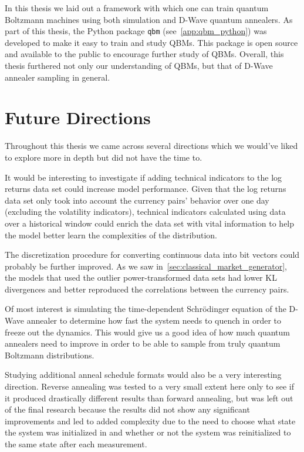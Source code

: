 In this thesis we laid out a framework with which one can train quantum Boltzmann machines using both simulation and D-Wave quantum annealers.
As part of this thesis, the Python package \texttt{qbm} (see~\cref{app:qbm_python}) was developed to make it easy to train and study QBMs.
This package is open source and available to the public to encourage further study of QBMs.
Overall, this thesis furthered not only our understanding of QBMs, but that of D-Wave annealer sampling in general.


\section{Future Directions}
Throughout this thesis we came across several directions which we would've liked to explore more in depth but did not have the time to.

It would be interesting to investigate if adding technical indicators to the log returns data set could increase model performance.
Given that the log returns data set only took into account the currency pairs' behavior over one day (excluding the volatility indicators), technical indicators calculated using data over a historical window could enrich the data set with vital information to help the model better learn the complexities of the distribution.

The discretization procedure for converting continuous data into bit vectors could probably be further improved.
As we saw in~\cref{sec:classical_market_generator}, the models that used the outlier power-transformed data sets had lower KL divergences and better reproduced the correlations between the currency pairs.

Of most interest is simulating the time-dependent Schr\"odinger equation of the D-Wave annealer to determine how fast the system needs to quench in order to freeze out the dynamics.
This would give us a good idea of how much quantum annealers need to improve in order to be able to sample from truly quantum Boltzmann distributions.

Studying additional anneal schedule formats would also be a very interesting direction.
Reverse annealing was tested to a very small extent here only to see if it produced drastically different results than forward annealing, but was left out of the final research because the results did not show any significant improvements and led to added complexity due to the need to choose what state the system was initialized in and whether or not the system was reinitialized to the same state after each measurement.
